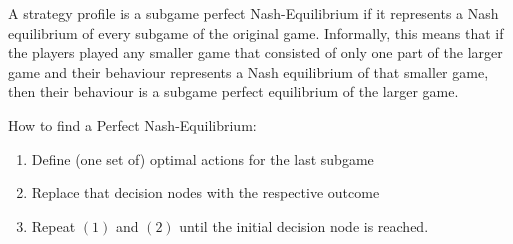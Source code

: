 \begin{definition}  
A strategy profile is a subgame perfect Nash-Equilibrium if it represents a Nash equilibrium of every subgame of the original game. Informally, this means that if the players played any smaller game that consisted of only one part of the larger game and their behaviour represents a Nash equilibrium of that smaller game, then their behaviour is a subgame perfect equilibrium of the larger game. 
\end{definition}
How to find a Perfect Nash-Equilibrium:
\begin{enumerate}
	\item Define (one set of) optimal actions for the last subgame
	\item Replace that decision nodes with the respective outcome
	\item Repeat $(1)$ and $(2)$ until the initial decision node is reached.
\end{enumerate}

